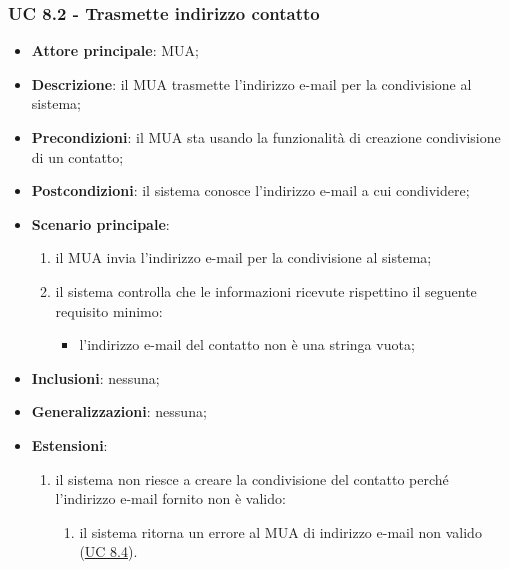     \subsubsection{UC 8.2 - Trasmette indirizzo contatto} \label{sec:UC8.2}
    \begin{itemize}
        \item \textbf{Attore principale}: MUA;
        \item \textbf{Descrizione}: il MUA trasmette l'indirizzo e-mail per la condivisione al sistema;
        \item \textbf{Precondizioni}: il MUA sta usando la funzionalità di creazione condivisione di un contatto;
        \item \textbf{Postcondizioni}: il sistema conosce l'indirizzo e-mail a cui condividere;
        \item \textbf{Scenario principale}:
            \begin{enumerate}
                \item il MUA invia l'indirizzo e-mail per la condivisione al sistema;
                \item il sistema controlla che le informazioni ricevute rispettino il seguente requisito minimo:
                    \begin{itemize}
                        \item l'indirizzo e-mail del contatto non è una stringa vuota;
                    \end{itemize}
            \end{enumerate}
        \item \textbf{Inclusioni}: nessuna;
        \item \textbf{Generalizzazioni}: nessuna;
        \item \textbf{Estensioni}:
            \begin{enumerate}[label=\alph*.]
                \item il sistema non riesce a creare la condivisione del contatto perché l'indirizzo e-mail fornito non è valido:
                \begin{enumerate}[label=\arabic*.]
                    \item il sistema ritorna un errore al MUA di indirizzo e-mail non valido (\hyperref[sec:UC8.4]{UC 8.4}).
                \end{enumerate}
            \end{enumerate}
    \end{itemize}


